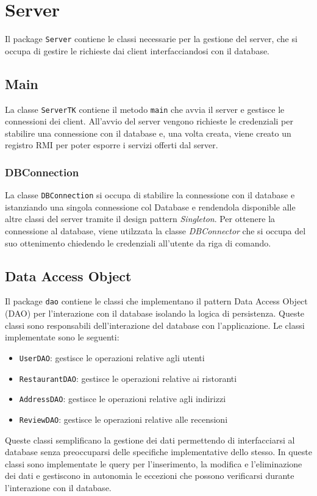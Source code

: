 \section{Server}
Il package \texttt{Server} contiene le classi necessarie per 
la gestione del server, che si occupa di gestire le richieste 
dai client interfacciandosi con il database.

\subsection{Main}
La classe \texttt{ServerTK} contiene il metodo \texttt{main} 
che avvia il server e gestisce le connessioni dei client.
All'avvio del server vengono richieste le credenziali per stabilire 
una connessione con il database e, una volta creata, viene creato un 
registro RMI per poter esporre i servizi offerti dal server.

\subsubsection{DBConnection}
La classe \texttt{DBConnection} si occupa di stabilire
la connessione con il database e 
istanziando una singola connessione col Database e rendendola disponible 
alle altre classi del server tramite il design pattern \textit{Singleton}.
Per ottenere la connessione al database, viene utilzzata la classe 
\textit{DBConnector} che si occupa del suo ottenimento
chiedendo le credenziali all'utente da riga di comando.


\subsection{Data Access Object}
Il package \texttt{dao} contiene le classi che implementano 
il pattern Data Access Object (DAO) per l'interazione
con il database isolando la logica di persistenza.
Queste classi sono responsabili dell'interazione 
del database con l'applicazione.
Le classi implementate sono le seguenti:
\begin{itemize}
    \item \texttt{UserDAO}: gestisce le operazioni relative agli utenti
    \item \texttt{RestaurantDAO}: gestisce le operazioni relative ai ristoranti
    \item \texttt{AddressDAO}: gestisce le operazioni relative agli indirizzi
    \item \texttt{ReviewDAO}: gestisce le operazioni relative alle recensioni
\end{itemize}
Queste classi semplificano la gestione dei dati permettendo 
di interfacciarsi al database senza preoccuparsi delle specifiche
implementative dello stesso. 
In queste classi sono implementate le query per l'inserimento, 
la modifica e l'eliminazione dei dati e gestiscono in autonomia 
le eccezioni che possono verificarsi durante l'interazione
con il database.
